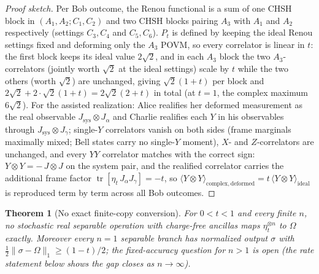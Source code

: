 \documentclass[11pt]{article}
\theoremstyle{plain}
\newtheorem{theorem}{Theorem}[section]
\theoremstyle{definition}
\theoremstyle{remark}
\theoremstyle{plain}
\newcommand{\tr}{\operatorname{tr}}
\newcommand{\Om}{\Omega}
\begin{document}
\begin{proof}[Proof sketch]
Per Bob outcome, the Renou functional is a sum of one CHSH block
in $(A_1,A_2;C_1,C_2)$ and two CHSH blocks pairing $A_3$ with
$A_1$ and $A_2$ respectively (settings $C_3,C_4$ and $C_5,C_6$).
$P_t$ is defined by keeping the ideal Renou settings fixed and
deforming only the $A_3$ POVM, so every correlator is linear in
$t$: the first block keeps its ideal value $2\sqrt2$, and in each
$A_3$ block the two $A_3$-correlators (jointly worth $\sqrt2$ at
the ideal settings) scale by $t$ while the two others (worth
$\sqrt2$) are unchanged, giving $\sqrt2(1+t)$ per block and
$2\sqrt2 + 2\cdot\sqrt2(1+t) = 2\sqrt2(2+t)$ in total (at $t=1$,
the complex maximum $6\sqrt2$). For the assisted realization:
Alice realifies her deformed measurement as the real observable
$J_{\mathrm{sys}}\otimes J_\alpha$ and Charlie realifies each $Y$
in his observables through $J_{\mathrm{sys}}\otimes J_\gamma$;
single-$Y$ correlators vanish on both sides (frame marginals
maximally mixed; Bell states carry no single-$Y$ moment), $X$- and
$Z$-correlators are unchanged, and every $YY$ correlator matches
with the correct sign: $Y\otimes Y = -\,J\otimes J$ on the system
pair, and the realified correlator carries the additional frame
factor $\tr[\eta_t\,J_\alpha J_\gamma] = -t$, so
$\langle Y\otimes Y\rangle_{\mathrm{complex,deformed}} =
t\,\langle Y\otimes Y\rangle_{\mathrm{ideal}}$ is reproduced term
by term across all Bob outcomes.
\end{proof}

\begin{theorem}[No exact finite-copy conversion]\label{thm:noexact}
For $0<t<1$ and every finite $n$, no stochastic real separable
operation with charge-free ancillas maps $\eta_t^{\otimes n}$ to
$\Om$ exactly. Moreover every $n = 1$ separable branch has
normalized output $\sigma$ with
$\tfrac12\|\sigma-\Om\|_1\ge(1-t)/2$; the fixed-accuracy question
for $n>1$ is open (the rate statement below shows the gap closes
as $n\to\infty$).
\end{theorem}
\end{document}
